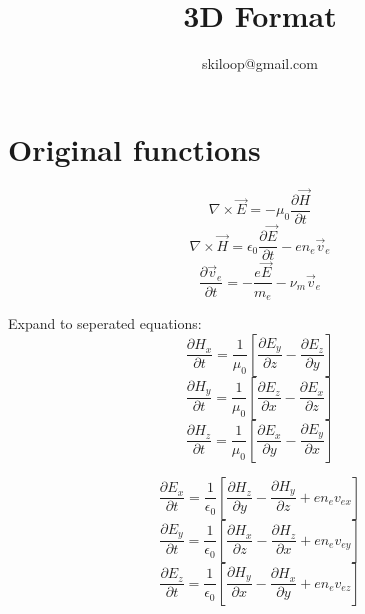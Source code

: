\documentclass[a4paper,10pt]{article}
\title{3D Format}
\author{skiloop@gmail.com}
\begin{document}
\maketitle
\section{Original functions}
\begin{equation}
\nabla \times \vec{E}=-\mu_{0}\frac{\partial \vec{H}}{\partial t}
\end{equation}
\begin{equation}
\nabla \times \vec{H}=\epsilon_{0}\frac{\partial \vec{E}}{\partial t}-e n_{e}\vec{v}_{e}
\end{equation}
\begin{equation}
\frac{\partial\vec{v}_{e}}{\partial t}=-\frac{e\vec{E}}{m_{e}}-\nu_{m}\vec{v}_{e}
\end{equation}

Expand to seperated equations:
\begin{equation}\label{eqHx}
\frac{\partial H_{x}}{\partial t}=\frac{1}{\mu_{0}}\left[\frac{\partial E_{y}}{\partial z}-\frac{\partial E_{z}}{\partial y}\right]
\end{equation}
\begin{equation}\label{eqHy}
\frac{\partial H_{y}}{\partial t}=\frac{1}{\mu_{0}}\left[\frac{\partial E_{z}}{\partial x}-\frac{\partial E_{x}}{\partial z}\right]
\end{equation}
\begin{equation}\label{eqHz}
\frac{\partial H_{z}}{\partial t}=\frac{1}{\mu_{0}}\left[\frac{\partial E_{x}}{\partial y}-\frac{\partial E_{y}}{\partial x}\right]
\end{equation}

\begin{equation}\label{eqEx}
\frac{\partial E_{x}}{\partial t}=\frac{1}{\epsilon_{0}}\left[\frac{\partial H_{z}}{\partial y}-\frac{\partial H_{y}}{\partial z}+e n_{e}v_{ex}\right]
\end{equation}
\begin{equation}\label{eqEy}
\frac{\partial E_{y}}{\partial t}=\frac{1}{\epsilon_{0}}\left[\frac{\partial H_{x}}{\partial z}-\frac{\partial H_{z}}{\partial x}+e n_{e}v_{ey}\right]
\end{equation}
\begin{equation}\label{eqEz}
\frac{\partial E_{z}}{\partial t}=\frac{1}{\epsilon_{0}}\left[\frac{\partial H_{y}}{\partial x}-\frac{\partial H_{x}}{\partial y}+e n_{e}v_{ez}\right]
\end{equation}
\end{document}
